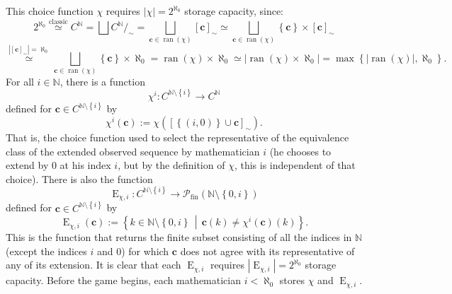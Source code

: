 \documentclass[11pt, a4paper, oneside]{article}
\theoremstyle{remark}
\theoremstyle{lemma}
\begin{document}
\\\\
This choice function \( \chi \) requires \( \left| \chi \right| = 2^{\aleph_0} \) storage capacity, since:
\[
2^{\aleph_0} \overset{\text{classic}}{\simeq} C^{\mathbb{N}} = \bigsqcup C^{\mathbb{N}} /_{\sim} = \bigsqcup_{\mathbf{c} \in \operatorname{ran} \left( \chi \right)} \left[ \mathbf{c} \right]_{\sim} \simeq \bigsqcup_{\mathbf{c} \in \operatorname{ran} \left( \chi \right)} \left\{ \mathbf{c} \right\} \times \left[ \mathbf{c} \right]_{\sim}
\]
\[
\overset{ \left| \left[ \mathbf{c} \right]_{\sim} \right| = \aleph_0 }{\simeq} \bigsqcup_{\mathbf{c} \in \operatorname{ran} \left( \chi \right)} \left\{ \mathbf{c} \right\} \times \aleph_0 = \operatorname{ran} \left( \chi \right) \times \aleph_0 \simeq \left| \operatorname{ran} \left( \chi \right) \times \aleph_0 \right| = \max \left\{ \left| \operatorname{ran} \left( \chi \right) \right|, \aleph_0 \right\}.
\]
For all \( i \in \mathbb{N} \), there is a function
\[
\chi^{i} \colon C^{\mathbb{N} \setminus \left\{ i \right\}} \rightarrow C^{\mathbb{N}}
\]
defined for \( \mathbf{c} \in C^{\mathbb{N} \setminus \left\{ i \right\}} \) by
\[
\chi^{i} \left( \mathbf{c} \right) := \chi \left( \left[ \left\{ \left( i, 0 \right) \right\} \cup \mathbf{c} \right]_{\sim} \right).
\]
That is, the choice function used to select the representative of the equivalence class of the extended observed sequence by mathematician \( i \) (he chooses to extend by \( 0 \) at his index $i$, but by the definition of \( \chi \), this is independent of that choice). There is also the function
\[
\operatorname{E}_{\chi, i} \colon C^{\mathbb{N} \setminus \left\{ i \right\}} \rightarrow \mathscr{P}_{\mathrm{fin}} \left( \mathbb{N} \setminus \left\{ 0, i \right\} \right)
\]
defined for \( \mathbf{c} \in C^{\mathbb{N} \setminus \left\{ i \right\}} \) by
\[
\operatorname{E}_{\chi, i} \left( \mathbf{c} \right) := \left\{ k \in \mathbb{N} \setminus \left\{ 0, i \right\} \,\middle|\, \mathbf{c}(k) \neq \chi^{i} \left( \mathbf{c} \right)(k) \right\}.
\]
This is the function that returns the finite subset consisting of all the indices in \( \mathbb{N} \) (except the indices \( i \) and \( 0 \)) for which \( \mathbf{c} \) does not agree with its representative of any of its extension. It is clear that each \( \operatorname{E}_{\chi, i} \) requires \( \left| \operatorname{E}_{\chi, i} \right| = 2^{\aleph_0} \) storage capacity. Before the game begins, each mathematician \( i < \aleph_0 \) stores \( \chi \) and \( \operatorname{E}_{\chi, i} \).
\\\\
\end{document}
